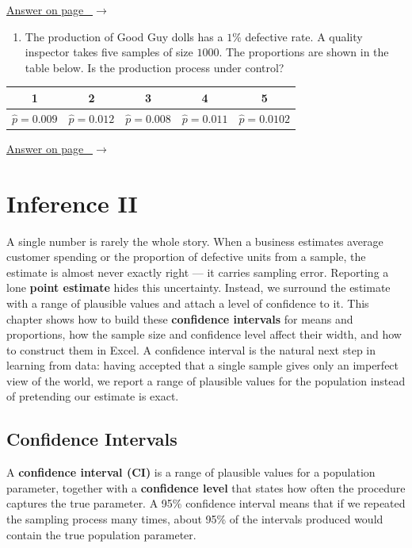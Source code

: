 \documentclass[
  11pt,
  letterpaper,
  DIV=11,
  numbers=noendperiod,
  oneside,
  open=any]{scrreprt}
\providecommand{\tightlist}{%
  \setlength{\itemsep}{0pt}\setlength{\parskip}{0pt}}\usepackage{longtable,booktabs,array}
\newcommand{\bsanswerref}[1]{%
  \par\nopagebreak\hypertarget{q-#1}{}\label{q-#1}%
  {\raggedleft\sffamily\footnotesize\hyperlink{a-#1}{\textcolor{bsaccent}{Answer on page \pageref{a-#1}\ $\rightarrow$}}\par}%
  \medskip}
\begin{document}
\bsanswerref{bsans111}

\begin{enumerate}
\def\labelenumi{\arabic{enumi}.}
\setcounter{enumi}{1}
\tightlist
\item
  The production of Good Guy dolls has a \(1\%\) defective rate. A
  quality inspector takes five samples of size \(1000\). The proportions
  are shown in the table below. Is the production process under control?
\end{enumerate}

\begin{center}
\begin{tabular}{ccccc}
\toprule
1 & 2 & 3 & 4 & 5 \\
\midrule
\(\hat{p}=0.009\) & \(\hat{p}=0.012\) & \(\hat{p}=0.008\) & \(\hat{p}=0.011\) & \(\hat{p}=0.0102\) \\
\bottomrule
\end{tabular}
\end{center}

\bsanswerref{bsans112}

\chapter{Inference II}\label{inference-ii}

A single number is rarely the whole story. When a business estimates
average customer spending or the proportion of defective units from a
sample, the estimate is almost never exactly right --- it carries
sampling error. Reporting a lone \textbf{point estimate} hides this
uncertainty. Instead, we surround the estimate with a range of plausible
values and attach a level of confidence to it. This chapter shows how to
build these \textbf{confidence intervals} for means and proportions, how
the sample size and confidence level affect their width, and how to
construct them in Excel. A confidence interval is the natural next step
in learning from data: having accepted that a single sample gives only
an imperfect view of the world, we report a range of plausible values
for the population instead of pretending our estimate is exact.

\section{Confidence Intervals}\label{confidence-intervals}

A \textbf{confidence interval (CI)} is a range of plausible values for a
population parameter, together with a \textbf{confidence level} that
states how often the procedure captures the true parameter. A 95\%
confidence interval means that if we repeated the sampling process many
times, about 95\% of the intervals produced would contain the true
population parameter.
\end{document}
